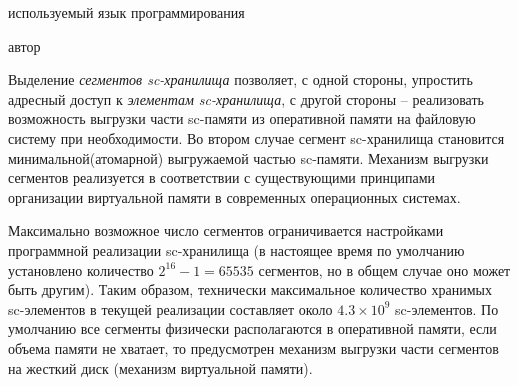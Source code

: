 
\begin{SCn}
\begin{scnindent}
    \begin{scnindent}
    \end{scnindent}
\end{scnindent}
\begin{scnrelfromlist}{используемый язык программирования}
\end{scnrelfromlist}
\begin{scnrelfromlist}{автор}
\end{scnrelfromlist}
\end{SCn}

Выделение \textit{сегментов sc-хранилища} позволяет, с одной стороны, упростить адресный доступ к \textit{элементам
sc-хранилища}, с другой стороны -- реализовать возможность выгрузки части sc-памяти из оперативной памяти на файловую
систему при необходимости. Во втором случае сегмент sc-хранилища становится минимальной(атомарной) выгружаемой частью
sc-памяти. Механизм выгрузки сегментов реализуется в соответствии с существующими принципами организации виртуальной
памяти в современных операционных системах.

Максимально возможное число сегментов ограничивается настройками программной реализации sc-хранилища (в настоящее время
по умолчанию установлено количество $2^{16}-1=65535$ сегментов, но в общем случае оно может быть другим). Таким
образом, технически максимальное количество хранимых sc-элементов в текущей реализации составляет около $4.3 \times
10^{9}$ sc-элементов. По умолчанию все сегменты физически располагаются в оперативной памяти, если объема памяти не
хватает, то предусмотрен механизм выгрузки части сегментов на жесткий диск (механизм виртуальной памяти).

